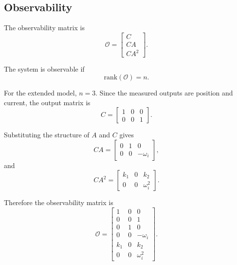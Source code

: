 \subsection{Observability}

The observability matrix is
\begin{equation}
    \mathcal{O} =
    \begin{bmatrix}
        C \\
        CA \\
        CA^2
    \end{bmatrix}.
\end{equation}

The system is observable if
\begin{equation}
    \mathrm{rank}(\mathcal{O}) = n.
\end{equation}

For the extended model, $n=3$. Since the measured outputs are position and current, the output
matrix is
\begin{equation}
    C =
    \begin{bmatrix}
        1 & 0 & 0 \\
        0 & 0 & 1
    \end{bmatrix}.
\end{equation}

Substituting the structure of $A$ and $C$ gives
\begin{equation}
    CA =
    \begin{bmatrix}
        0 & 1 & 0 \\
        0 & 0 & -\omega_i
    \end{bmatrix},
\end{equation}
and
\begin{equation}
    CA^2 =
    \begin{bmatrix}
        k_1 & 0 & k_2 \\
        0 & 0 & \omega_i^2
    \end{bmatrix}.
\end{equation}

Therefore the observability matrix is
\begin{equation}
    \mathcal{O} =
    \begin{bmatrix}
        1 & 0 & 0 \\
        0 & 0 & 1 \\
        0 & 1 & 0 \\
        0 & 0 & -\omega_i \\
        k_1 & 0 & k_2 \\
        0 & 0 & \omega_i^2
    \end{bmatrix}.
\end{equation}

